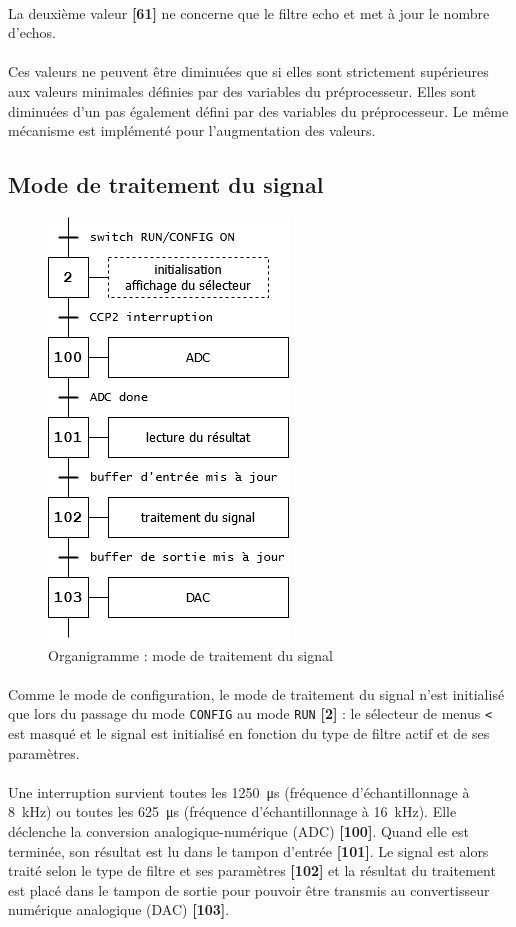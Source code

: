 \documentclass{article}
\begin{document}
    \paragraph{}
    La deuxième valeur \textbf{[61]} ne concerne que le filtre echo et met à jour le nombre d'echos.

    \paragraph{}
    Ces valeurs ne peuvent être diminuées que si elles sont strictement supérieures aux valeurs minimales définies par des variables du préprocesseur. Elles sont diminuées d'un pas également défini par des variables du préprocesseur. Le même mécanisme est implémenté pour l'augmentation des valeurs.

    \subsection{Mode de traitement du signal}
    \begin{figure}[H]
        \centering
        \includegraphics[width=.2\textwidth]{./images/orga_run.png}
        \caption{Organigramme : mode de traitement du signal}
    \end{figure}

    \paragraph{}
    Comme le mode de configuration, le mode de traitement du signal n'est initialisé que lors du passage du mode \texttt{CONFIG} au mode \texttt{RUN} \textbf{[2]} : le sélecteur de menus \texttt{<} est masqué et le signal est initialisé en fonction du type de filtre actif et de ses paramètres.

    \paragraph{}
    Une interruption survient toutes les \SI{1250}{\micro\second} (fréquence d'échantillonnage à \SI{8}{\kilo\hertz}) ou toutes les \SI{625}{\micro\second} (fréquence d'échantillonnage à \SI{16}{\kilo\hertz}). Elle déclenche la conversion analogique-numérique (ADC) \textbf{[100]}. Quand elle est terminée, son résultat est lu dans le tampon d'entrée \textbf{[101]}. Le signal est alors traité selon le type de filtre et ses paramètres \textbf{[102]} et la résultat du traitement est placé dans le tampon de sortie pour pouvoir être transmis au convertisseur numérique analogique (DAC) \textbf{[103]}.
\end{document}
